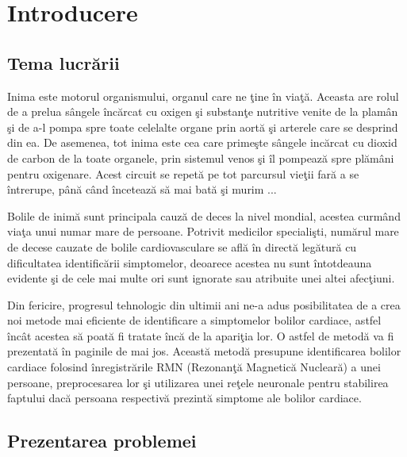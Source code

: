 \chapter{Introducere}

\section{Tema lucr\u{a}rii}

Inima este motorul organismului, organul care ne \c{t}ine \^{i}n via\c{t}\u{a}. Aceasta are rolul de a prelua s\^{a}ngele \^{i}nc\u{a}rcat cu oxigen \c{s}i substan\c{t}e nutritive venite de la plam\^{a}n \c{s}i de a-l pompa spre toate celelalte organe prin aort\u{a} \c{s}i arterele care se desprind din ea. De asemenea, tot inima este cea care prime\c{s}te s\^{a}ngele inc\u{a}rcat cu dioxid de carbon de la toate organele, prin sistemul venos \c{s}i \^{i}l pompeaz\u{a} spre pl\u{a}m\^{a}ni pentru oxigenare. Acest circuit se repet\u{a} pe tot parcursul vie\c{t}ii far\u{a} a se \^{i}ntrerupe, p\^{a}n\u{a} c\^{a}nd \^{i}nceteaz\u{a} s\u{a} mai bat\u{a} \c{s}i murim ...
\par 
Bolile de inim\u{a} sunt principala cauz\u{a} de deces la nivel mondial, acestea curm\^{a}nd via\c{t}a unui numar mare de persoane. Potrivit medicilor speciali\c{s}ti, num\u{a}rul mare de decese cauzate de bolile cardiovasculare se afl\u{a} \^{i}n direct\u{a} leg\u{a}tur\u{a} cu dificultatea identific\u{a}rii simptomelor, deoarece acestea nu sunt \^{i}ntotdeauna evidente \c{s}i de cele mai multe ori sunt ignorate sau atribuite unei altei afec\c{t}iuni.
\par 
Din fericire, progresul tehnologic din ultimii ani ne-a adus posibilitatea de a crea noi metode mai eficiente de identificare a simptomelor bolilor cardiace, astfel \^{i}nc\^{a}t acestea s\u{a} poat\u{a} fi tratate \^{i}nc\u{a} de la apari\c{t}ia lor. O astfel de metod\u{a} va fi prezentat\u{a} \^{i}n paginile de mai jos. Aceast\u{a} metod\u{a} presupune identificarea bolilor cardiace folosind \^{i}nregistr\u{a}rile RMN (Rezonan\c{t}\u{a} Magnetic\u{a} Nuclear\u{a}) a unei persoane, preprocesarea lor \c{s}i utilizarea unei re\c{t}ele neuronale pentru stabilirea faptului dac\u{a} persoana respectiv\u{a} prezint\u{a} simptome ale bolilor cardiace.

\section{Prezentarea problemei}

